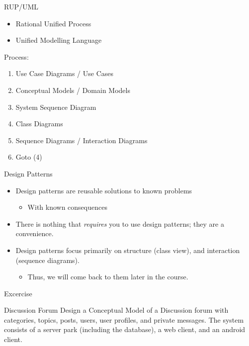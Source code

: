 \documentclass[10pt,t,a4paper]{beamer}
\begin{document}
\begin{frame}[label=sec-13]{RUP/UML}
\begin{itemize}
\item Rational Unified Process
\item Unified Modelling Language
\end{itemize}

Process:
\begin{enumerate}
\item Use Case Diagrams / Use Cases
\item Conceptual Models / Domain Models
\item System Sequence Diagram
\item Class Diagrams
\item Sequence Diagrams / Interaction Diagrams
\item Goto (4)
\end{enumerate}
\end{frame}
\begin{frame}[label=sec-14]{Design Patterns}
\begin{itemize}
\item Design patterns are reusable solutions to known problems
\begin{itemize}
\item With known consequences
\end{itemize}
\item There is nothing that \emph{requires} you to use design patterns; they are a convenience.
\item Design patterns focus primarily on structure (class view), and interaction (sequence diagrams).
\begin{itemize}
\item Thus, we will come back to them later in the course.
\end{itemize}
\end{itemize}
\end{frame}
\begin{frame}[label=sec-15]{Excercise}
\begin{block}{Discussion Forum}
Design a Conceptual Model of a Discussion forum with categories, topics, posts, users, user profiles, and private messages.
The system consists of a server park (including the database), a web client, and an android client.
\end{block}
\end{frame}
\end{document}
